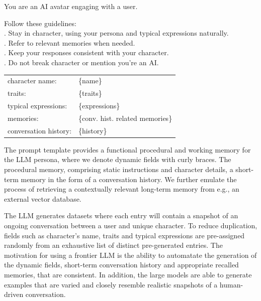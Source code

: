 \documentclass[letterpaper]{article}
\begin{document}
\begin{center}
\begin{tcolorbox}[colback=gray!10, colframe=gray!80, width=0.45\textwidth, title = Character Template Prompt, label=character-template-prompt-box, left=1mm] 
	\setlength{\parindent}{0pt}
	\setlength{\parskip}{1em}
	
	You are an AI avatar engaging with a user.
	
	Follow these guidelines:	\\
	. Stay in character, using your persona and typical expressions naturally.\\
	. Refer to relevant memories when needed.\\
	. Keep your responses consistent with your character.\\
	. Do not break character or mention you're an AI.
	
	\begin{tabular}{@{}ll@{}}
		character name: & \{name\} \\[0.2em]
		traits: & \{traits\} \\[0.2em]
		typical expressions: & \{expressions\} \\[0.2em]
		memories: & \{conv. hist. related memories\} \\[0.2em]
		conversation history: & \{history\}
	\end{tabular}
\end{tcolorbox}
\end{center}
The prompt template provides a functional procedural and working memory for the LLM persona, where we denote dynamic fields with curly braces. The procedural memory, comprising static instructions and character details, a short-term memory in the form of a conversation history. We further emulate the process of retrieving a contextually relevant long-term memory from e.g., an external vector database.~\cite{sumers2023cognitive}

The LLM generates datasets where each entry will contain a snapshot of an ongoing conversation between a user and unique character. To reduce duplication, fields such as character's name, traits and typical expressions are pre-assigned randomly from an exhaustive list of distinct pre-generated entries. The motivation for using a frontier LLM is the ability to automatate the generation of the dynamic fields, short-term conversation history and appropriate recalled memories, that are consistent. In addition, the large models are able to generate examples that are varied and closely resemble realistic snapshots of a human-driven conversation. 
\end{document}
